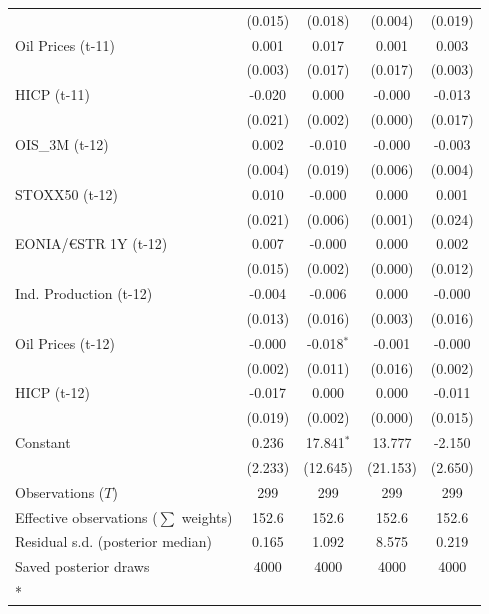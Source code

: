 \begin{longtable}[t]{lcccc}
 & (0.015) & (0.018) & (0.004) & (0.019)\\
Oil Prices (t-11) & 0.001 & 0.017 & 0.001 & 0.003\\
 & (0.003) & (0.017) & (0.017) & (0.003)\\
HICP (t-11) & -0.020 & 0.000 & -0.000 & -0.013\\
 & (0.021) & (0.002) & (0.000) & (0.017)\\
OIS\_3M (t-12) & 0.002 & -0.010 & -0.000 & -0.003\\
 & (0.004) & (0.019) & (0.006) & (0.004)\\
STOXX50 (t-12) & 0.010 & -0.000 & 0.000 & 0.001\\
 & (0.021) & (0.006) & (0.001) & (0.024)\\
EONIA/€STR 1Y (t-12) & 0.007 & -0.000 & 0.000 & 0.002\\
 & (0.015) & (0.002) & (0.000) & (0.012)\\
Ind. Production (t-12) & -0.004 & -0.006 & 0.000 & -0.000\\
 & (0.013) & (0.016) & (0.003) & (0.016)\\
Oil Prices (t-12) & -0.000 & -0.018$^{*}$ & -0.001 & -0.000\\
 & (0.002) & (0.011) & (0.016) & (0.002)\\
HICP (t-12) & -0.017 & 0.000 & 0.000 & -0.011\\
 & (0.019) & (0.002) & (0.000) & (0.015)\\
Constant & 0.236 & 17.841$^{*}$ & 13.777 & -2.150\\
 & (2.233) & (12.645) & (21.153) & (2.650)\\
\midrule
Observations ($T$) & 299 & 299 & 299 & 299\\
Effective observations ($\sum$ weights) & 152.6 & 152.6 & 152.6 & 152.6\\
Residual s.d. (posterior median) & 0.165 & 1.092 & 8.575 & 0.219\\
Saved posterior draws & 4000 & 4000 & 4000 & 4000\\*
\end{longtable}
\endgroup{}

